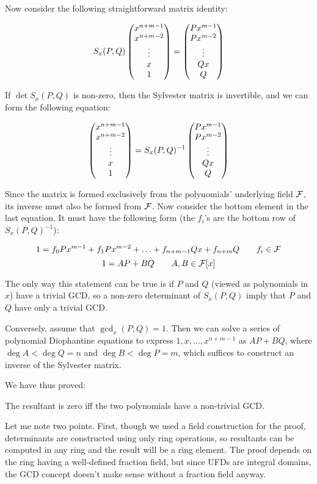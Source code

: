 Now consider the following straightforward matrix identity:

$$ S_x(P,Q) \begin{pmatrix}x^{n+m-1}\cr x^{n+m-2}\cr \vdots \cr x \cr 1\end{pmatrix}
 = \begin{pmatrix}P x^{m-1}\cr P x^{m-2}\cr \vdots \cr Q x \cr Q\end{pmatrix} $$

If $\det S_x(P,Q)$ is non-zero, then the Sylvester matrix is
invertible, and we can form the following equation:

$$ \begin{pmatrix}x^{n+m-1}\cr x^{n+m-2}\cr \vdots \cr x \cr 1\end{pmatrix}
 = S_x(P,Q)^{-1} \begin{pmatrix}P x^{m-1}\cr P x^{m-2}\cr \vdots \cr Q x \cr Q\end{pmatrix} $$

Since the matrix is formed exclusively from the polynomials'
underlying field ${\cal F}$, its inverse must also be formed from
${\cal F}$.  Now consider the bottom element in the last equation.  It
must have the following form (the $f_i$'s are the bottom row of
$S_x(P,Q)^{-1}$):

$$ 1 = f_0 P x^{m-1} + f_1 P x^{m-2} + \ldots + f_{n+m-1} Q x + f_{n+m} Q \qquad f_i \in {\cal F}$$
$$ 1 = A P + B Q \qquad A,B \in {\cal F}[x] $$

The only way this statement can be true is if $P$ and $Q$ (viewed
as polynomials in $x$) have a
trivial GCD, so a non-zero determinant of $S_x(P,Q)$ imply that $P$ and
$Q$ have only a trivial GCD.

Conversely, assume that $\gcd_x(P,Q) = 1$.  Then we can solve a series
of polynomial Diophantine equations to express $1, x, \ldots,
x^{n+m-1}$ as $AP+BQ$, where $\deg A < \deg Q = n$ and $\deg B <
\deg P = m$, which suffices to construct an inverse of the Sylvester
matrix.

We have thus proved:

\begin{theorem}\label{resultant theorem}
The resultant is zero iff the two polynomials have a non-trivial GCD.
\end{theorem}

Let me note two points.  First, though we used a field construction
for the proof, determinants are constructed using only ring
operations, so resultants can be computed in any ring and the result
will be a ring element.  The proof depends on the ring having a
well-defined fraction field, but since UFDs are integral domains, the
GCD concept doesn't make sense without a fraction field anyway.

